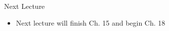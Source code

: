\documentclass[aspectratio=1610]{beamer}
\begin{document}

%			
%			

\begin{frame}[wide]{Next Lecture}
	\begin{itemize}
		\item Next lecture will finish Ch. 15 and begin Ch. 18
	\end{itemize}
\end{frame}
\end{document}
